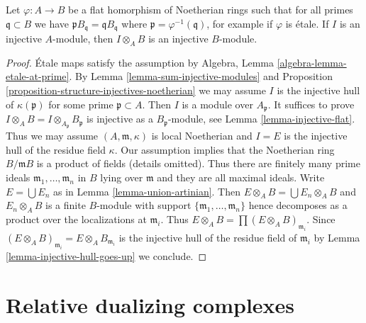 \begin{lemma}
\label{lemma-injective-goes-up}
Let $\varphi : A \to B$ be a flat homorphism of Noetherian rings such
that for all primes $\mathfrak q \subset B$ we have
$\mathfrak p B_\mathfrak q = \mathfrak qB_\mathfrak q$
where $\mathfrak p = \varphi^{-1}(\mathfrak q)$, for example
if $\varphi$ is \'etale.
If $I$ is an injective $A$-module, then $I \otimes_A B$ is
an injective $B$-module.
\end{lemma}

\begin{proof}
\'Etale maps satisfy the assumption by
Algebra, Lemma \ref{algebra-lemma-etale-at-prime}.
By Lemma \ref{lemma-sum-injective-modules} and
Proposition \ref{proposition-structure-injectives-noetherian}
we may assume $I$ is the injective hull of $\kappa(\mathfrak p)$
for some prime $\mathfrak p \subset A$.
Then $I$ is a module over $A_\mathfrak p$.
It suffices to prove $I \otimes_A B = I \otimes_{A_\mathfrak p} B_\mathfrak p$
is injective as a $B_\mathfrak p$-module, see
Lemma \ref{lemma-injective-flat}.
Thus we may assume $(A, \mathfrak m, \kappa)$ is local Noetherian
and $I = E$ is the injective hull of the residue field $\kappa$.
Our assumption implies that the Noetherian ring $B/\mathfrak m B$
is a product of fields (details omitted).
Thus there are finitely many prime ideals
$\mathfrak m_1, \ldots, \mathfrak m_n$ in $B$
lying over $\mathfrak m$ and they are all maximal ideals.
Write $E = \bigcup E_n$ as in Lemma \ref{lemma-union-artinian}.
Then $E \otimes_A B = \bigcup E_n \otimes_A B$
and $E_n \otimes_A B$ is a finite $B$-module with support
$\{\mathfrak m_1, \ldots, \mathfrak m_n\}$ hence decomposes
as a product over the localizations at $\mathfrak m_i$.
Thus $E \otimes_A B = \prod (E \otimes_A B)_{\mathfrak m_i}$.
Since $(E \otimes_A B)_{\mathfrak m_i} = E \otimes_A B_{\mathfrak m_i}$
is the injective hull of the residue field of $\mathfrak m_i$
by Lemma \ref{lemma-injective-hull-goes-up} we conclude.
\end{proof}






\section{Relative dualizing complexes}
\label{section-relative-dualizing-complexes}

